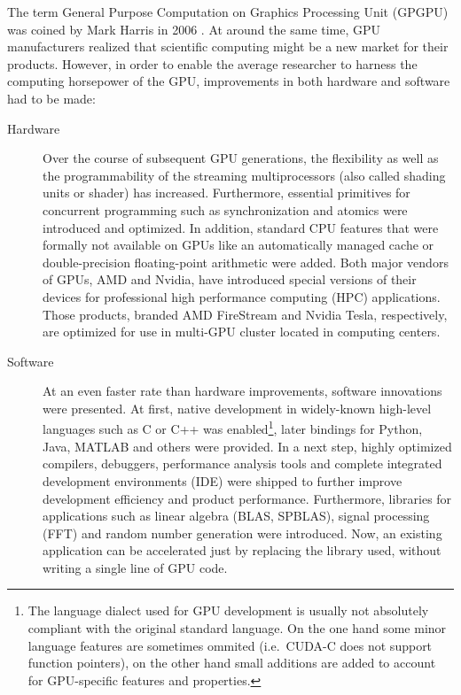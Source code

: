 The term General Purpose Computation on Graphics Processing Unit (GPGPU) was coined by Mark Harris in 2006 \cite{luebke_gpgpu:_2006}. At around the same time, GPU manufacturers realized that scientific computing might be a new market for their products. However, in order to enable the average researcher to harness the computing horsepower of the GPU, improvements in both hardware and software had to be made:
\begin{description}
\item[Hardware] Over the course of subsequent GPU generations, the flexibility as well as the programmability of the streaming multiprocessors (also called shading units or shader) has increased. Furthermore, essential primitives for concurrent programming such as synchronization and atomics were introduced and optimized. In addition, standard CPU features that were formally not available on GPUs like an automatically managed cache or double-precision floating-point arithmetic were added. Both major vendors of GPUs, AMD and Nvidia, have introduced special versions of their devices for professional high performance computing (HPC) applications. Those products, branded AMD FireStream and Nvidia Tesla, respectively, are optimized for use in multi-GPU cluster located in computing centers. 
\item[Software] At an even faster rate than hardware improvements, software innovations were presented. At first, native development in widely-known high-level languages such as C or C++ was enabled\footnote{The language dialect used for GPU development is usually not absolutely compliant with the original standard language. On the one hand some minor language features are sometimes ommited (i.e.\ CUDA-C does not support function pointers), on the other hand small additions are added to account for GPU-specific features and properties.}, later bindings for Python, Java, MATLAB and others were provided. In a next step, highly optimized compilers, debuggers, performance analysis tools and complete integrated development environments (IDE) were shipped to further improve development efficiency and product performance. Furthermore, libraries for applications such as linear algebra (BLAS, SPBLAS), signal processing (FFT) and random number generation were introduced. Now, an existing application can be accelerated just by replacing the library used, without writing a single line of GPU code. 
\end{description}

